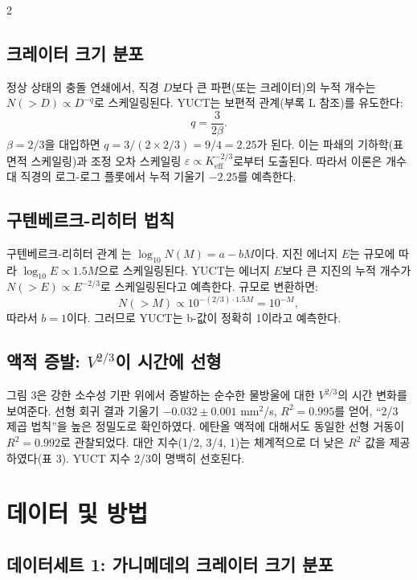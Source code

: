 \documentclass[11pt,a4paper]{article}
\newcommand{\eps}{\varepsilon}
\newcommand{\Keff}{K_{\mathrm{eff}}}
\newcommand{\betaf}{\beta}
\begin{document}
\begin{multicols}{2}
		\subsection{크레이터 크기 분포}
		
		정상 상태의 충돌 연쇄에서, 직경 \(D\)보다 큰 파편(또는 크레이터)의 누적 개수는 \(N(>D) \propto D^{-q}\)로 스케일링된다. YUCT는 보편적 관계(부록 L 참조)를 유도한다:
		\[
		q = \frac{3}{2\betaf}.
		\]
		\(\betaf = 2/3\)을 대입하면 \(q = 3/(2 \times 2/3) = 9/4 = 2.25\)가 된다. 이는 파쇄의 기하학(표면적 스케일링)과 조정 오차 스케일링 \(\eps \propto \Keff^{-2/3}\)로부터 도출된다. 따라서 이론은 개수 대 직경의 로그-로그 플롯에서 누적 기울기 \(-2.25\)를 예측한다.
		
		\subsection{구텐베르크-리히터 법칙}
		
		구텐베르크-리히터 관계 \cite{GutenbergRichter1954}는 \(\log_{10} N(M) = a - b M\)이다. 지진 에너지 \(E\)는 규모에 따라 \(\log_{10} E \propto 1.5 M\)으로 스케일링된다. YUCT는 에너지 \(E\)보다 큰 지진의 누적 개수가 \(N(>E) \propto E^{-2/3}\)로 스케일링된다고 예측한다. 규모로 변환하면:
		\[
		N(>M) \propto 10^{-(2/3) \cdot 1.5 M} = 10^{-M},
		\]
		따라서 \(b = 1\)이다. 그러므로 YUCT는 b-값이 정확히 1이라고 예측한다.
		
		\subsection{액적 증발: \(V^{2/3}\)이 시간에 선형}
		
		그림 3은 강한 소수성 기판 위에서 증발하는 순수한 물방울에 대한 \(V^{2/3}\)의 시간 변화를 보여준다. 선형 회귀 결과 기울기 \(-0.032 \pm 0.001\) mm\(^2\)/s, \(R^2 = 0.995\)를 얻어, “2/3 제곱 법칙”을 높은 정밀도로 확인하였다. 에탄올 액적에 대해서도 동일한 선형 거동이 \(R^2 = 0.992\)로 관찰되었다. 대안 지수(1/2, 3/4, 1)는 체계적으로 더 낮은 \(R^2\) 값을 제공하였다(표 3). YUCT 지수 2/3이 명백히 선호된다.
		
		\section{데이터 및 방법}
		
		\subsection{데이터세트 1: 가니메데의 크레이터 크기 분포}
		

\end{multicols}
\end{document}

